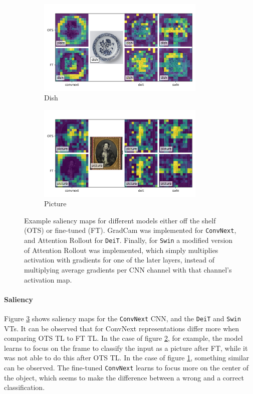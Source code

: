 \begin{figure}[tb]
    \centering
    \begin{subfigure}{0.49\textwidth}
    \includegraphics[width=8cm]{img/img005_salience.png}
    \caption{Dish}
    \label{results:img:sal:dish}
    \end{subfigure}
    \begin{subfigure}{0.49\textwidth}
    \includegraphics[width=8cm]{img/img011_salience.png}
    \caption{Picture}
    \label{results:img:sal:picture}
    \end{subfigure}
    \caption{Example saliency maps for different models either off the shelf (OTS) or fine-tuned (FT). GradCam was implemented for \texttt{ConvNext}, and Attention Rollout for \texttt{DeiT}. Finally, for \texttt{Swin} a modified version of Attention Rollout was implemented, which simply multiplies activation with gradients for one of the later layers, instead of multiplying average gradients per CNN channel with that channel's activation map.}
    \label{results:img:sal}
\end{figure}

\paragraph{Saliency}
Figure \ref{results:img:sal} shows saliency maps for the \texttt{ConvNext} CNN, and the \texttt{DeiT} and \texttt{Swin} VTs. It can be observed that for ConvNext representations differ more when comparing OTS TL to FT TL. In the case of figure \ref{results:img:sal:picture}, for example, the model learns to focus on the frame to classify the input as a picture after FT, while it was not able to do this after OTS TL. In the case of figure \ref{results:img:sal:dish}, something similar can be observed. The fine-tuned \texttt{ConvNext} learns to focus more on the center of the object, which seems to make the difference between a wrong and a correct classification.
